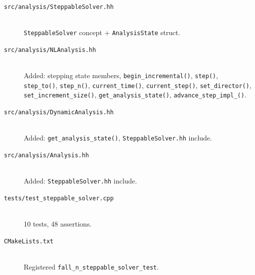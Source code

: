 \begin{description}
  \item[\texttt{src/analysis/SteppableSolver.hh}] \hfill \\
    \texttt{SteppableSolver} concept + \texttt{AnalysisState} struct.
  \item[\texttt{src/analysis/NLAnalysis.hh}] \hfill \\
    Added: stepping state members, \texttt{begin\_incremental()},
    \texttt{step()}, \texttt{step\_to()}, \texttt{step\_n()},
    \texttt{current\_time()}, \texttt{current\_step()},
    \texttt{set\_director()}, \texttt{set\_increment\_size()},
    \texttt{get\_analysis\_state()}, \texttt{advance\_step\_impl\_()}.
  \item[\texttt{src/analysis/DynamicAnalysis.hh}] \hfill \\
    Added: \texttt{get\_analysis\_state()}, \texttt{SteppableSolver.hh} include.
  \item[\texttt{src/analysis/Analysis.hh}] \hfill \\
    Added: \texttt{SteppableSolver.hh} include.
  \item[\texttt{tests/test\_steppable\_solver.cpp}] \hfill \\
    10 tests, 48 assertions.
  \item[\texttt{CMakeLists.txt}] \hfill \\
    Registered \texttt{fall\_n\_steppable\_solver\_test}.
\end{description}
